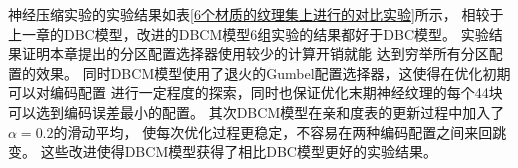 神经压缩实验的实验结果如表\ref{6个材质的纹理集上进行的对比实验}所示，
相较于上一章的DBC模型，改进的DBCM模型6组实验的结果都好于DBC模型。
实验结果证明本章提出的分区配置选择器使用较少的计算开销就能
达到穷举所有分区配置的效果。
同时DBCM模型使用了退火的Gumbel配置选择器，这使得在优化初期可以对编码配置
进行一定程度的探索，同时也保证优化末期神经纹理的每个4\times4块可以选到编码误差最小的配置。
其次DBCM模型在亲和度表的更新过程中加入了$\alpha=0.2$的滑动平均，
使每次优化过程更稳定，不容易在两种编码配置之间来回跳变。
这些改进使得DBCM模型获得了相比DBC模型更好的实验结果。

\begin{table*}[htbp]
    \centering
    \caption{6个材质的纹理集上进行的对比实验结果}
    \label{6个材质的纹理集上进行的对比实验}        
    \resizebox{\linewidth}{!}{
}
\end{table*}
